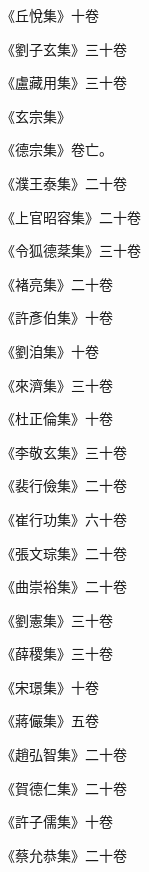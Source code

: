 \begin{pinyinscope}
 《丘悅集》十卷



 《劉子玄集》三十卷



 《盧藏用集》三十卷



 《玄宗集》



 《德宗集》卷亡。



 《濮王泰集》二十卷



 《上官昭容集》二十卷



 《令狐德棻集》三十卷



 《褚亮集》二十卷



 《許彥伯集》十卷



 《劉洎集》十卷



 《來濟集》三十卷



 《杜正倫集》十卷



 《李敬玄集》三十卷



 《裴行儉集》二十卷



 《崔行功集》六十卷



 《張文琮集》二十卷



 《曲崇裕集》二十卷



 《劉憲集》三十卷



 《薛稷集》三十卷



 《宋璟集》十卷



 《蔣儼集》五卷



 《趙弘智集》二十卷



 《賀德仁集》二十卷



 《許子儒集》十卷



 《蔡允恭集》二十卷




\end{pinyinscope}

